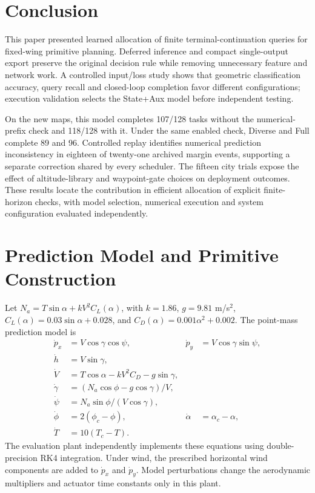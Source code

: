 \documentclass[journal]{IEEEtran}
\begin{document}
\section{Conclusion}
This paper presented learned allocation of finite terminal-continuation queries for fixed-wing primitive planning. Deferred inference and compact single-output export preserve the original decision rule while removing unnecessary feature and network work. A controlled input/loss study shows that geometric classification accuracy, query recall and closed-loop completion favor different configurations; execution validation selects the State+Aux model before independent testing.

On the new maps, this model completes 107/128 tasks without the numerical-prefix check and 118/128 with it. Under the same enabled check, Diverse and Full complete 89 and 96. Controlled replay identifies numerical prediction inconsistency in eighteen of twenty-one archived margin events, supporting a separate correction shared by every scheduler. The fifteen city trials expose the effect of altitude-library and waypoint-gate choices on deployment outcomes. These results locate the contribution in efficient allocation of explicit finite-horizon checks, with model selection, numerical execution and system configuration evaluated independently.
\appendices
\section{Prediction Model and Primitive Construction}\label{app:model}
Let $N_a=T\sin\alpha+kV^2C_L(\alpha)$, with $k=1.86$, $g=9.81$ m/s$^2$, $C_L(\alpha)=0.03\sin\alpha+0.028$, and $C_D(\alpha)=0.001\alpha^2+0.002$. The point-mass prediction model is
\begin{align}
 \dot p_x&=V\cos\gamma\cos\psi,&\dot p_y&=V\cos\gamma\sin\psi,\\
 \dot h&=V\sin\gamma,\\
 \dot V&=T\cos\alpha-kV^2C_D-g\sin\gamma,\\
 \dot\gamma&=(N_a\cos\phi-g\cos\gamma)/V,\\
 \dot\psi&=N_a\sin\phi/(V\cos\gamma),\\
 \dot\phi&=2(\phi_c-\phi),&\dot\alpha&=\alpha_c-\alpha,\\
 \dot T&=10(T_c-T).
\end{align}
The evaluation plant independently implements these equations using double-precision RK4 integration. Under wind, the prescribed horizontal wind components are added to $\dot p_x$ and $\dot p_y$. Model perturbations change the aerodynamic multipliers and actuator time constants only in this plant.
\end{document}

